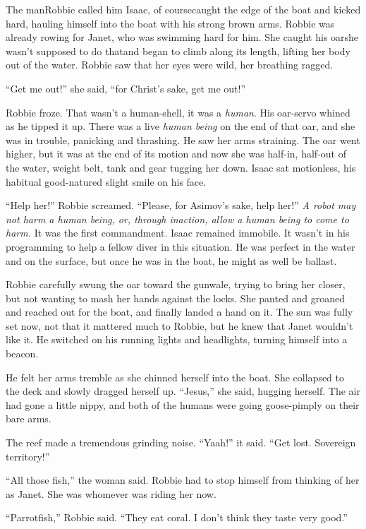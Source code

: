 The man\dash{}Robbie called him Isaac, of course\dash{}caught the edge of the
boat and kicked hard, hauling himself into the boat with his strong
brown arms. Robbie was already rowing for Janet, who was swimming
hard for him. She caught his oar\dash{}she wasn’t supposed to do that\dash{}and
began to climb along its length, lifting her body out of the water.
Robbie saw that her eyes were wild, her breathing ragged.

“Get me out!” she said, “for Christ’s sake, get me out!”

Robbie froze. That wasn’t a human-shell, it was a \emph{human}. His
oar-servo whined as he tipped it up. There was a live
\emph{human being} on the end of that oar, and she was in trouble,
panicking and thrashing. He saw her arms straining. The oar went
higher, but it was at the end of its motion and now she was
half-in, half-out of the water, weight belt, tank and gear tugging
her down. Isaac sat motionless, his habitual good-natured slight
smile on his face.

“Help her!” Robbie screamed. “Please, for Asimov’s sake, help her!”
\emph{A robot may not harm a human being, or, through inaction, allow a human being to come to harm.}
It was the first commandment. Isaac remained immobile. It wasn’t in
his programming to help a fellow diver in this situation. He was
perfect in the water and on the surface, but once he was in the
boat, he might as well be ballast.

Robbie carefully swung the oar toward the gunwale, trying to bring
her closer, but not wanting to mash her hands against the locks.
She panted and groaned and reached out for the boat, and finally
landed a hand on it. The sun was fully set now, not that it
mattered much to Robbie, but he knew that Janet wouldn’t like it.
He switched on his running lights and headlights, turning himself
into a beacon.

He felt her arms tremble as she chinned herself into the boat. She
collapsed to the deck and slowly dragged herself up. “Jesus,” she
said, hugging herself. The air had gone a little nippy, and both of
the humans were going goose-pimply on their bare arms.

The reef made a tremendous grinding noise. “Yaah!” it said. “Get
lost. Sovereign territory!”

“All those fish,” the woman said. Robbie had to stop himself from
thinking of her as Janet. She was whomever was riding her now.

“Parrotfish,” Robbie said. “They eat coral. I don’t think they
taste very good.”

